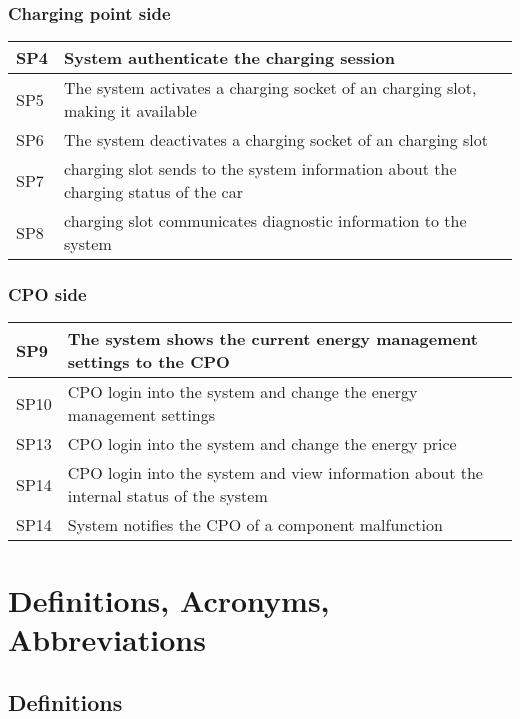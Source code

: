 \subsubsection{Charging point side}
\begin{tabular}{|l|l|}
	\hline
	SP4 & System authenticate the charging session\\
	\hline
	SP5 & The system activates a charging socket of an charging slot, making it available \\
	\hline
	SP6 & The system deactivates a charging socket of an charging slot\\
	\hline
	SP7 & charging slot sends to the system information about the charging status of the car\\
	\hline
	SP8 & charging slot communicates diagnostic information to the system\\
	\hline
\end{tabular}

\subsubsection{CPO side}
\begin{tabular}{|l|l|}
	\hline
	SP9 & The system shows the current energy management settings to the CPO\\
	\hline
	SP10 & CPO login into the system and change the energy management settings\\
	\hline
	SP13 & CPO login into the system and change the energy price\\
	\hline
	SP14 & CPO login into the system and view information about the internal status of the system\\
	\hline
	SP14 & System notifies the CPO of a component malfunction\\
	\hline
\end{tabular}


\section{Definitions, Acronyms, Abbreviations}

\subsection{Definitions}

